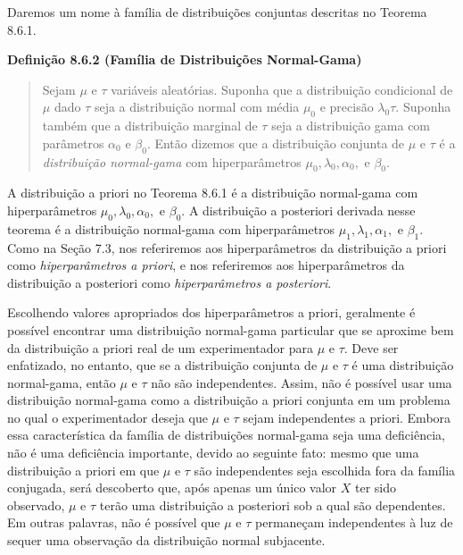 Daremos um nome à família de distribuições conjuntas descritas no Teorema 8.6.1.

\vspace{1em}
\noindent\textbf{Definição 8.6.2 (Família de Distribuições Normal-Gama)}
\begin{quote}
    Sejam $\mu$ e $\tau$ variáveis aleatórias. Suponha que a distribuição condicional de $\mu$ dado $\tau$ seja a distribuição normal com média $\mu_0$ e precisão $\lambda_0\tau$. Suponha também que a distribuição marginal de $\tau$ seja a distribuição gama com parâmetros $\alpha_0$ e $\beta_0$. Então dizemos que a distribuição conjunta de $\mu$ e $\tau$ é a \textit{distribuição normal-gama} com hiperparâmetros $\mu_0, \lambda_0, \alpha_0,$ e $\beta_0$.
\end{quote}
\vspace{1em}

A distribuição a priori no Teorema 8.6.1 é a distribuição normal-gama com hiperparâmetros $\mu_0, \lambda_0, \alpha_0,$ e $\beta_0$. A distribuição a posteriori derivada nesse teorema é a distribuição normal-gama com hiperparâmetros $\mu_1, \lambda_1, \alpha_1,$ e $\beta_1$. Como na Seção 7.3, nos referiremos aos hiperparâmetros da distribuição a priori como \textit{hiperparâmetros a priori}, e nos referiremos aos hiperparâmetros da distribuição a posteriori como \textit{hiperparâmetros a posteriori}.

Escolhendo valores apropriados dos hiperparâmetros a priori, geralmente é possível encontrar uma distribuição normal-gama particular que se aproxime bem da distribuição a priori real de um experimentador para $\mu$ e $\tau$. Deve ser enfatizado, no entanto, que se a distribuição conjunta de $\mu$ e $\tau$ é uma distribuição normal-gama, então $\mu$ e $\tau$ não são independentes. Assim, não é possível usar uma distribuição normal-gama como a distribuição a priori conjunta em um problema no qual o experimentador deseja que $\mu$ e $\tau$ sejam independentes a priori. Embora essa característica da família de distribuições normal-gama seja uma deficiência, não é uma deficiência importante, devido ao seguinte fato: mesmo que uma distribuição a priori em que $\mu$ e $\tau$ são independentes seja escolhida fora da família conjugada, será descoberto que, após apenas um único valor $X$ ter sido observado, $\mu$ e $\tau$ terão uma distribuição a posteriori sob a qual são dependentes. Em outras palavras, não é possível que $\mu$ e $\tau$ permaneçam independentes à luz de sequer uma observação da distribuição normal subjacente.

